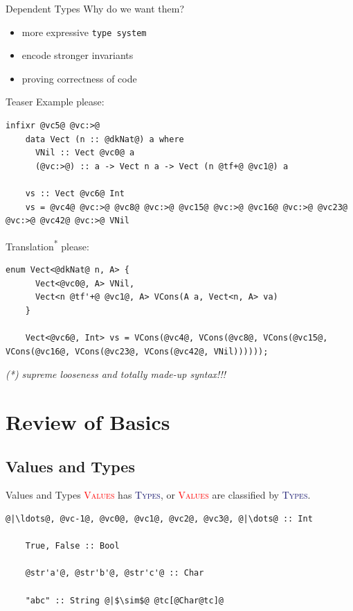 \documentclass[xcolor={usenames,dvipsnames}]{beamer}
\newcommand{\htycon}[1]{\textcolor{MidnightBlue}{\textsc{#1}}}
\newcommand{\hvalcon}[1]{\textcolor{Red}{\textsc{#1}}}
\begin{document}
\begin{frame}[fragile]{Dependent Types}
  Why do we want them?
  \begin{itemize}
    \item more expressive \texttt{type system}
    \item encode stronger invariants
    \item proving correctness of code
  \end{itemize}
\end{frame}

\begin{frame}[fragile]{Teaser}
  Example please:
  \begin{lstlisting}[style=hask]
    infixr @vc5@ @vc:>@
    data Vect (n :: @dkNat@) a where
      VNil :: Vect @vc0@ a
      (@vc:>@) :: a -> Vect n a -> Vect (n @tf+@ @vc1@) a

    vs :: Vect @vc6@ Int
    vs = @vc4@ @vc:>@ @vc8@ @vc:>@ @vc15@ @vc:>@ @vc16@ @vc:>@ @vc23@ @vc:>@ @vc42@ @vc:>@ VNil
  \end{lstlisting}

  Translation\textsuperscript{*} please:
  \begin{lstlisting}[style=hask]
    enum Vect<@dkNat@ n, A> {
      Vect<@vc0@, A> VNil,
      Vect<n @tf'+@ @vc1@, A> VCons(A a, Vect<n, A> va)
    }

    Vect<@vc6@, Int> vs = VCons(@vc4@, VCons(@vc8@, VCons(@vc15@, VCons(@vc16@, VCons(@vc23@, VCons(@vc42@, VNil))))));
  \end{lstlisting}
  \textit{\tiny{(*) supreme looseness and totally made-up syntax!!!}}
\end{frame}


\section{Review of Basics}

\subsection{Values and Types}

\begin{frame}[fragile]{Values and Types}
  \hvalcon{Values} has \htycon{Types}, or \hvalcon{Values} are classified by \htycon{Types}.\\

  \begin{lstlisting}[style=hask]
    @|\ldots@, @vc-1@, @vc0@, @vc1@, @vc2@, @vc3@, @|\dots@ :: Int

    True, False :: Bool

    @str'a'@, @str'b'@, @str'c'@ :: Char

    "abc" :: String @|$\sim$@ @tc[@Char@tc]@
  \end{lstlisting}
\end{frame}
\end{document}
